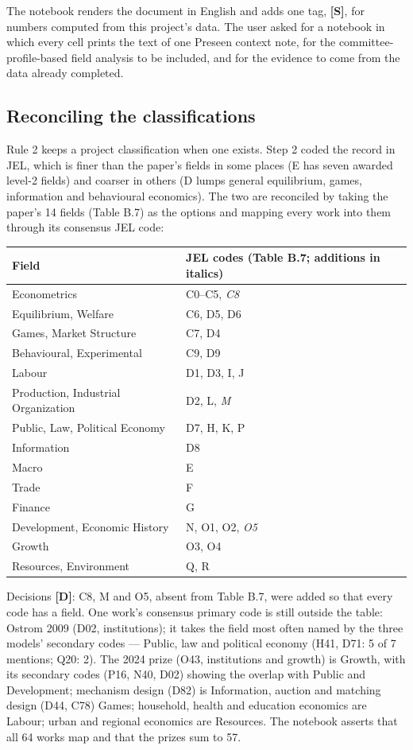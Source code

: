 \documentclass[11pt,a4paper]{article}
\newcommand{\evtag}[1]{\textbf{[#1]}}
\begin{document}
The notebook renders the document in English and adds one tag, \evtag{S}, for numbers computed from this project's
data. The user asked for a notebook in which every cell prints the text of one Preseen context note, for the
committee-profile-based field analysis to be included, and for the evidence to come from the data already completed.

\subsection{Reconciling the classifications}

Rule 2 keeps a project classification when one exists. Step 2 coded the record in JEL, which is finer than the
paper's fields in some places (E has seven awarded level-2 fields) and coarser in others (D lumps general
equilibrium, games, information and behavioural economics). The two are reconciled by taking the paper's 14 fields
(Table B.7) as the options and mapping every work into them through its consensus JEL code:

\begin{center}
\small
\begin{tabular}{@{}ll@{}}
\toprule
Field & JEL codes (Table B.7; additions in italics) \\
\midrule
Econometrics & C0--C5, \emph{C8} \\
Equilibrium, Welfare & C6, D5, D6 \\
Games, Market Structure & C7, D4 \\
Behavioural, Experimental & C9, D9 \\
Labour & D1, D3, I, J \\
Production, Industrial Organization & D2, L, \emph{M} \\
Public, Law, Political Economy & D7, H, K, P \\
Information & D8 \\
Macro & E \\
Trade & F \\
Finance & G \\
Development, Economic History & N, O1, O2, \emph{O5} \\
Growth & O3, O4 \\
Resources, Environment & Q, R \\
\bottomrule
\end{tabular}
\end{center}

Decisions \evtag{D}: C8, M and O5, absent from Table B.7, were added so that every code has a field. One work's
consensus primary code is still outside the table: Ostrom 2009 (D02, institutions); it takes the field most often
named by the three models' secondary codes --- Public, law and political economy (H41, D71: 5 of 7 mentions; Q20:
2). The 2024 prize (O43, institutions and growth) is Growth, with its secondary codes (P16, N40, D02) showing the
overlap with Public and Development; mechanism design (D82) is Information, auction and matching design (D44, C78)
Games; household, health and education economics are Labour; urban and regional economics are Resources. The
notebook asserts that all 64 works map and that the prizes sum to 57.
\end{document}
